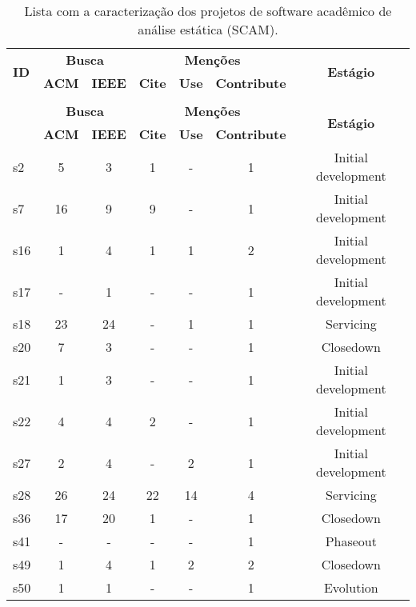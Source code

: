 \begin{longtable}{| l | c c | c c c | c |}
  \caption{Lista com a caracterização dos projetos de software acadêmico de análise estática (SCAM).}
  \label{dataset-table-scam} \\
  \hline
  \endfirsthead
  \hline
  \multirow{2}{*}{\textbf{ID}} & \multicolumn{2}{|c|}{\textbf{Busca}} & \multicolumn{3}{|c|}{\textbf{Menções}}               & \multirow{2}{*}{\textbf{Estágio}} \\
                               & \textbf{ACM} & \textbf{IEEE}       & \textbf{Cite} & \textbf{Use} & \textbf{Contribute} &                                   \\
  \hline
  \endhead \hhline{-------}
  \multicolumn{7}{c}{\textbf{continua na próxima página}} \\
  \hhline{-------} \endfoot
  \endlastfoot
  \multirow{2}{*}{\textbf{ID}} & \multicolumn{2}{|c|}{\textbf{Busca}} & \multicolumn{3}{|c|}{\textbf{Menções}}               & \multirow{2}{*}{\textbf{Estágio}} \\
                               & \textbf{ACM} & \textbf{IEEE}       & \textbf{Cite} & \textbf{Use} & \textbf{Contribute} &                                   \\
  \hline
s2 &
  5 &
  3 &
  1 &
  - &
  1 &
  Initial development \\
s7 &
  16 &
  9 &
  9 &
  - &
  1 &
  Initial development \\
s16 &
  1 &
  4 &
  1 &
  1 &
  2 &
  Initial development \\
s17 &
  - &
  1 &
  - &
  - &
  1 &
  Initial development \\
s18 &
  23 &
  24 &
  - &
  1 &
  1 &
  Servicing \\
s20 &
  7 &
  3 &
  - &
  - &
  1 &
  Closedown \\
s21 &
  1 &
  3 &
  - &
  - &
  1 &
  Initial development \\
s22 &
  4 &
  4 &
  2 &
  - &
  1 &
  Initial development \\
s27 &
  2 &
  4 &
  - &
  2 &
  1 &
  Initial development \\
s28 &
  26 &
  24 &
  22 &
  14 &
  4 &
  Servicing \\
s36 &
  17 &
  20 &
  1 &
  - &
  1 &
  Closedown \\
s41 &
  - &
  - &
  - &
  - &
  1 &
  Phaseout \\
s49 &
  1 &
  4 &
  1 &
  2 &
  2 &
  Closedown \\
s50 &
  1 &
  1 &
  - &
  - &
  1 &
  Evolution \\

\end{longtable}
